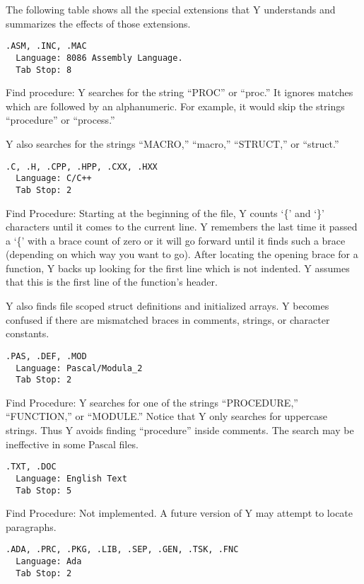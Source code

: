 The following table shows all the special extensions that Y understands and summarizes the
effects of those extensions.

\begin{verbatim}
.ASM, .INC, .MAC
  Language: 8086 Assembly Language.
  Tab Stop: 8
\end{verbatim}

Find procedure: Y searches for the string ``PROC'' or ``proc.'' It ignores matches which are
followed by an alphanumeric. For example, it would skip the strings ``procedure'' or
``process.''

Y also searches for the strings ``MACRO,'' ``macro,'' ``STRUCT,'' or ``struct.''

\begin{verbatim}
.C, .H, .CPP, .HPP, .CXX, .HXX
  Language: C/C++
  Tab Stop: 2
\end{verbatim}

Find Procedure: Starting at the beginning of the file, Y counts `\{' and `\}' characters until
it comes to the current line. Y remembers the last time it passed a `\{' with a brace count of
zero or it will go forward until it finds such a brace (depending on which way you want to go).
After locating the opening brace for a function, Y backs up looking for the first line which is
not indented. Y assumes that this is the first line of the function's header.

Y also finds file scoped struct definitions and initialized arrays. Y becomes confused if there
are mismatched braces in comments, strings, or character constants.

\begin{verbatim}
.PAS, .DEF, .MOD
  Language: Pascal/Modula_2
  Tab Stop: 2
\end{verbatim}

Find Procedure: Y searches for one of the strings ``PROCEDURE,'' ``FUNCTION,'' or ``MODULE.''
Notice that Y only searches for uppercase strings. Thus Y avoids finding ``procedure'' inside
comments. The search may be ineffective in some Pascal files.

\begin{verbatim}
.TXT, .DOC
  Language: English Text
  Tab Stop: 5
\end{verbatim}

Find Procedure: Not implemented. A future version of Y may attempt to locate paragraphs.

\begin{verbatim}
.ADA, .PRC, .PKG, .LIB, .SEP, .GEN, .TSK, .FNC
  Language: Ada
  Tab Stop: 2
\end{verbatim}


